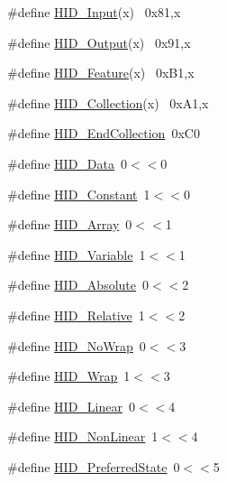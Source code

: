 \begin{DoxyCompactItemize}
\item 
\#define \hyperlink{group__USBD__HID_ga6fd986ff1222c3177576192014541340}{H\+I\+D\+\_\+\+Input}(x)                  ~0x81,x
\item 
\#define \hyperlink{group__USBD__HID_ga1849ee19be0544fe6d41a98cb48d3328}{H\+I\+D\+\_\+\+Output}(x)                ~0x91,x
\item 
\#define \hyperlink{group__USBD__HID_ga9d5bdc1d7868ac84c78ae87967fb6048}{H\+I\+D\+\_\+\+Feature}(x)              ~0x\+B1,x
\item 
\#define \hyperlink{group__USBD__HID_ga7612b8a60224ec755aa26b8d93ba744b}{H\+I\+D\+\_\+\+Collection}(x)        ~0x\+A1,x
\item 
\#define \hyperlink{group__USBD__HID_gabdeb55ecbe4e6774de16d7e73f14d1d4}{H\+I\+D\+\_\+\+End\+Collection}~0x\+C0
\item 
\#define \hyperlink{group__USBD__HID_ga6fdf3aabdbd36deecb675ec299911862}{H\+I\+D\+\_\+\+Data}~0$<$$<$0
\item 
\#define \hyperlink{group__USBD__HID_gaf565fe0a22495869e02aa47c45389eae}{H\+I\+D\+\_\+\+Constant}~1$<$$<$0
\item 
\#define \hyperlink{group__USBD__HID_gaf374e658483a3a5dd41a69edf2215809}{H\+I\+D\+\_\+\+Array}~0$<$$<$1
\item 
\#define \hyperlink{group__USBD__HID_ga10c7b1ae0313e8cba1251adb04f80f3e}{H\+I\+D\+\_\+\+Variable}~1$<$$<$1
\item 
\#define \hyperlink{group__USBD__HID_ga22ca1d152685e6df172bed86e51039d4}{H\+I\+D\+\_\+\+Absolute}~0$<$$<$2
\item 
\#define \hyperlink{group__USBD__HID_ga606c56b5542c71ccfa76ad2d955c353e}{H\+I\+D\+\_\+\+Relative}~1$<$$<$2
\item 
\#define \hyperlink{group__USBD__HID_ga68c5d55e947b616e4d097c91060dc1ef}{H\+I\+D\+\_\+\+No\+Wrap}~0$<$$<$3
\item 
\#define \hyperlink{group__USBD__HID_ga9e125d0a3fca1289a04eff6565a0c743}{H\+I\+D\+\_\+\+Wrap}~1$<$$<$3
\item 
\#define \hyperlink{group__USBD__HID_gaf248dc18a9f36f57b92c045bae3a64f9}{H\+I\+D\+\_\+\+Linear}~0$<$$<$4
\item 
\#define \hyperlink{group__USBD__HID_gac9f806072026e7c93b854e35c8fa42a5}{H\+I\+D\+\_\+\+Non\+Linear}~1$<$$<$4
\item 
\#define \hyperlink{group__USBD__HID_gaebb57bff4cb3ff0125242403cb6badbe}{H\+I\+D\+\_\+\+Preferred\+State}~0$<$$<$5
\item 
$$
\end{DoxyCompactItemize}
